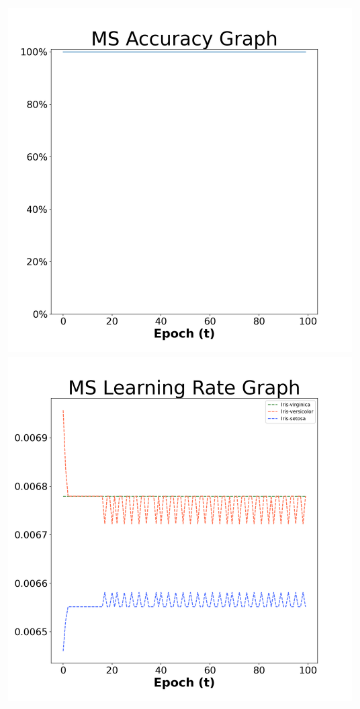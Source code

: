 \begin{figure}[H]
    \centering %
\begin{subfigure}{0.3\textwidth}
  \includegraphics[width=\linewidth]{images/exper1/iris/MS_0.01_acc.png}
    \includegraphics[width=\linewidth]{images/exper1/iris/MS_0.01_lr.png}

\end{subfigure}
\end{figure}
